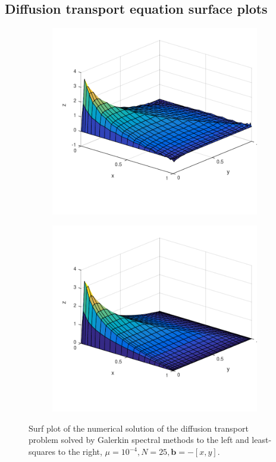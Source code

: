 \subsection{Diffusion transport equation surface plots}
\begin{figure}[h]
  \centering
  \begin{subfigure}[b]{0.48\textwidth}
	\includegraphics[width=\textwidth]{Figures/Spec_difftrans_aNeg.pdf}
  \end{subfigure}%
  \quad
  \begin{subfigure}[b]{0.48\textwidth}
	\includegraphics[width=\textwidth]{Figures/SpecLS_difftrans_aNeg.pdf}
  \end{subfigure}
  \vspace{-0.1\baselineskip}
	\caption{Surf plot of the numerical solution of the diffusion transport problem solved by Galerkin spectral methods to the left and least-squares to the right, $\mu = 10^{-4},N=25,\mathbf{b} = -[x,y]$.}
  \label{fig:SurfDiffTransPositive}
\end{figure}
